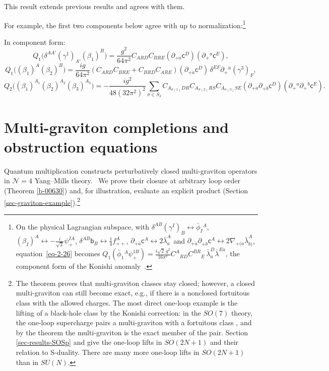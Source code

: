 \documentclass[11pt]{article}
\numberwithin{equation}{section}
\numberwithin{figure}{section}
\numberwithin{table}{section}
\begin{document}
This result extends previous results and agrees with them.

For example, the first two components below agree with \cite[Equations (3.66) and (3.67)]{BK} up to normalization:\footnote{On the physical Lagrangian subspace, with $\delta^{AB}(\gamma^I)_B\leftrightarrow\bar\phi_I{}^A$, $(\beta_I)^A\leftrightarrow-\frac{i}{\sqrt2}\psi_+^{IA}$, $\delta^{AB}\mathsf b_B\leftrightarrow\frac14f_{++}^A$, $\partial_{+\dot a}\mathsf c^A\leftrightarrow2\bar\lambda_{\dot a}^A$ and $\partial_{+\dot a}\partial_{+\dot b}\mathsf c^A\leftrightarrow2\nabla_{+(\dot a}\bar\lambda_{\dot b)}^A$, equation~\eqref{eq-2-26} becomes $Q_1(\bar\phi_1{}^A\psi_+^{1B})=\frac{i\sqrt2\,g^2}{16\pi^2}C^A{}_{RD}C^{BR}{}_E\,\bar\lambda_{\dot a}^D\bar\lambda^{E\dot a}$, the component form of the Konishi anomaly~\cite{Konishi}.}

In component form:~
\begin{equation}\label{eq-2-26}
Q_1\big(\delta^{AA'}(\gamma^1)_{A'}(\beta_1)^B\big)=\frac{g^2}{64\pi^2}C_{ARD}C_{BRE}(\partial_{+\dot a}\mathsf c^D)(\partial_+{}^{\dot a}\mathsf c^E),
\end{equation}
\begin{equation}\label{eq-2-27}
Q_1\big((\beta_1)^A(\beta_2)^B\big)=\frac{ig}{64\pi^2}(C_{ARD}C_{BRE}+C_{BRD}C_{ARE})(\partial_{+\dot a}\mathsf c^D)\,\delta^{EF}\partial_+{}^{\dot a}(\gamma^3)_F,
\end{equation}
\begin{equation}\label{eq-2-28}
Q_2\big((\beta_1)^{A_1}(\beta_2)^{A_2}(\beta_3)^{A_3}\big)=-\frac{ig^2}{48(32\pi^2)^2}\sum_{\sigma\in S_3}C_{A_{\sigma(1)}DR}C_{A_{\sigma(2)}RS}C_{A_{\sigma(3)}SE}(\partial_{+\dot a}\partial_{+\dot b}\mathsf c^D)(\partial_+{}^{\dot a}\partial_+{}^{\dot b}\mathsf c^E).
\end{equation}

\section{Multi-graviton completions and obstruction equations}\label{sec-lifting}

Quantum multiplication constructs perturbatively closed multi-graviton operators in $\mathcal N=4$ Yang--Mills theory.~ We prove their closure at arbitrary loop order (Theorem \ref{b-00630}) and, for illustration, evaluate an explicit product (Section \ref{sec-graviton-example}).\footnote{The theorem proves that multi-graviton classes stay closed; however, a closed multi-graviton can still become exact, e.g., if there is a nonclosed fortuitous class with the allowed charges. The most direct one-loop example is the lifting of a black-hole class by the Konishi correction: in the $SO(7)$ theory, the one-loop supercharge pairs a multi-graviton with a fortuitous class \cite[Section 3]{KonishiBH}, and by the theorem the multi-graviton is the exact member of the pair. Section \ref{sec-results-SOSp} and \cite[supplement, Section S3]{Repo} give the one-loop lifts in $SO(2N+1)$ and their relation to S-duality. There are many more one-loop lifts in $SO(2N+1)$ than in $SU(N)$.}
\end{document}
